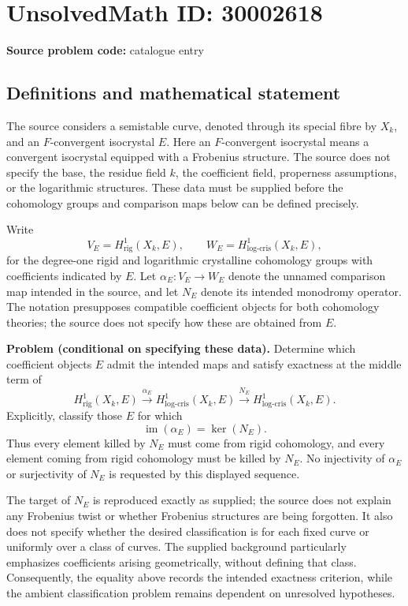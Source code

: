 \documentclass[11pt]{article}
\begin{document}
\section*{UnsolvedMath ID: 30002618}
\textbf{Source problem code:} catalogue entry
\subsection{Definitions and mathematical statement}
The source considers a semistable curve, denoted through its special fibre by \(X_k\), and an \(F\)-convergent isocrystal \(E\). Here an \(F\)-convergent isocrystal means a convergent isocrystal equipped with a Frobenius structure. The source does not specify the base, the residue field \(k\), the coefficient field, properness assumptions, or the logarithmic structures. These data must be supplied before the cohomology groups and comparison maps below can be defined precisely.

Write
\[
V_E=H^1_{\mathrm{rig}}(X_k,E),\qquad
W_E=H^1_{\mathrm{log\text{-}cris}}(X_k,E),
\]
for the degree-one rigid and logarithmic crystalline cohomology groups with coefficients indicated by \(E\). Let \(\alpha_E:V_E\to W_E\) denote the unnamed comparison map intended in the source, and let \(N_E\) denote its intended monodromy operator. The notation presupposes compatible coefficient objects for both cohomology theories; the source does not specify how these are obtained from \(E\).

\textbf{Problem (conditional on specifying these data).} Determine which coefficient objects \(E\) admit the intended maps and satisfy exactness at the middle term of
\[
H^1_{\mathrm{rig}}(X_k,E)
\xrightarrow{\alpha_E}
H^1_{\mathrm{log\text{-}cris}}(X_k,E)
\xrightarrow{N_E}
H^1_{\mathrm{log\text{-}cris}}(X_k,E).
\]
Explicitly, classify those \(E\) for which
\[
\operatorname{im}(\alpha_E)=\ker(N_E).
\]
Thus every element killed by \(N_E\) must come from rigid cohomology, and every element coming from rigid cohomology must be killed by \(N_E\). No injectivity of \(\alpha_E\) or surjectivity of \(N_E\) is requested by this displayed sequence.

The target of \(N_E\) is reproduced exactly as supplied; the source does not explain any Frobenius twist or whether Frobenius structures are being forgotten. It also does not specify whether the desired classification is for each fixed curve or uniformly over a class of curves. The supplied background particularly emphasizes coefficients arising geometrically, without defining that class. Consequently, the equality above records the intended exactness criterion, while the ambient classification problem remains dependent on unresolved hypotheses.
\end{document}
